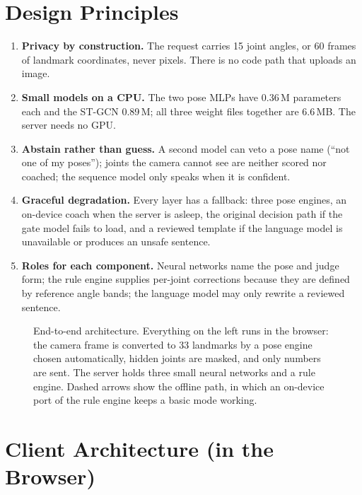 \documentclass[11pt,a4paper]{article}
\begin{document}
\section{Design Principles}
\begin{enumerate}
\item \textbf{Privacy by construction.} The request carries 15 joint angles, or 60 frames of landmark coordinates, never pixels. There is no code path that uploads an image.
\item \textbf{Small models on a CPU.} The two pose MLPs have 0.36\,M parameters each and the ST-GCN 0.89\,M; all three weight files together are 6.6\,MB. The server needs no GPU.
\item \textbf{Abstain rather than guess.} A second model can veto a pose name (``not one of my poses''); joints the camera cannot see are neither scored nor coached; the sequence model only speaks when it is confident.
\item \textbf{Graceful degradation.} Every layer has a fallback: three pose engines, an on-device coach when the server is asleep, the original decision path if the gate model fails to load, and a reviewed template if the language model is unavailable or produces an unsafe sentence.
\item \textbf{Roles for each component.} Neural networks name the pose and judge form; the rule engine supplies per-joint corrections because they are defined by reference angle bands; the language model may only rewrite a reviewed sentence.
\end{enumerate}

\begin{landscape}
\thispagestyle{empty}
\begin{figure}[p]
\centering
\resizebox{24.5cm}{!}{}
\caption{End-to-end architecture. Everything on the left runs in the browser: the camera frame is converted to 33 landmarks by a pose engine chosen automatically, hidden joints are masked, and only numbers are sent. The server holds three small neural networks and a rule engine. Dashed arrows show the offline path, in which an on-device port of the rule engine keeps a basic mode working.}
\label{fig:arch}
\end{figure}
\end{landscape}

\section{Client Architecture (in the Browser)}
\end{document}
